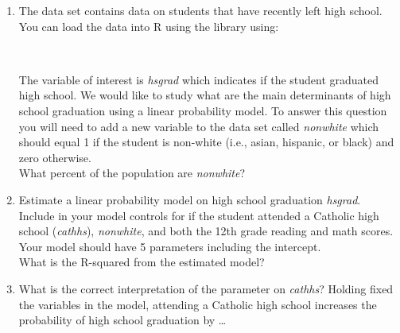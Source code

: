 \begin{enumerate}
\item {}
The data set  contains data on students that have recently left high school. You can load the data into R using the  library using:

\medskip
{}\\
\medskip

The variable of interest is \textit{hsgrad} which indicates if the student graduated high school. We would like to study what are the main determinants of high school graduation using a linear probability model. To answer this question you will need to add a new variable to the data set called \textit{nonwhite} which should equal 1 if the student is non-white (i.e., asian, hispanic, or black) and zero otherwise.\\
What percent of the population are \textit{nonwhite}?

\item Estimate a linear probability model on high school graduation \textit{hsgrad}.\\
Include in your model controls for if the student attended a Catholic high school (\textit{cathhs}), \textit{nonwhite}, and both the 12th grade reading and math scores. Your model should have 5 parameters including the intercept.\\
What is the R-squared from the estimated model?

\item What is the correct interpretation of the parameter on \textit{cathhs}? Holding fixed the variables in the model, attending a Catholic high school increases the probability of high school graduation by \dots
{}


\end{enumerate}
